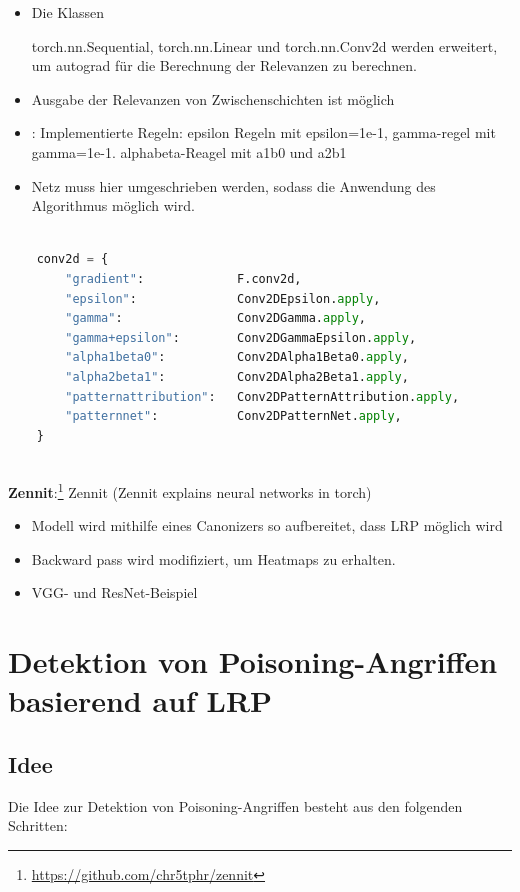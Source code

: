 \documentclass[twoside, 11pt,a4paper]{article}
\numberwithin{equation}{section}
\begin{document}
	\begin{itemize}
		\item Die Klassen
	
	torch.nn.Sequential, torch.nn.Linear und torch.nn.Conv2d werden erweitert, um autograd für die Berechnung der Relevanzen zu berechnen.
	
		\item Ausgabe der Relevanzen von Zwischenschichten ist möglich
		\item: Implementierte Regeln: epsilon Regeln mit epsilon=1e-1, gamma-regel mit gamma=1e-1. alphabeta-Reagel mit a1b0 und a2b1
		\item Netz muss hier umgeschrieben werden, sodass die Anwendung des Algorithmus möglich wird.
	\end{itemize}

\begin{lstlisting}[language=Python, caption=Implementierte Regeln fhvilshoj]

	conv2d = {
		"gradient":             F.conv2d,
		"epsilon":              Conv2DEpsilon.apply,
		"gamma":                Conv2DGamma.apply,
		"gamma+epsilon":        Conv2DGammaEpsilon.apply,
		"alpha1beta0":          Conv2DAlpha1Beta0.apply,
		"alpha2beta1":          Conv2DAlpha2Beta1.apply,
		"patternattribution":   Conv2DPatternAttribution.apply,
		"patternnet":           Conv2DPatternNet.apply,
	}
	
\end{lstlisting}
	
	\noindent \textbf{Zennit}:\footnote{\url{https://github.com/chr5tphr/zennit}}
	Zennit (Zennit explains neural networks in torch) 
	\begin{itemize}
		\item Modell wird mithilfe eines Canonizers so aufbereitet, dass LRP möglich wird
		\item Backward pass wird modifiziert, um Heatmaps zu erhalten.
		\item VGG- und ResNet-Beispiel
	\end{itemize}
	\section{Detektion von Poisoning-Angriffen basierend auf LRP} \label{chapter_algorithm}
	\subsection{Idee}
	Die Idee zur Detektion von Poisoning-Angriffen besteht aus den folgenden Schritten:
	
\end{document}
